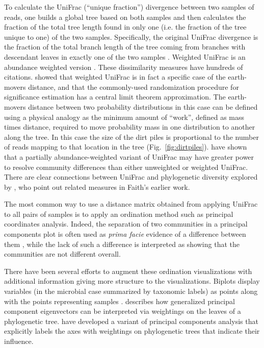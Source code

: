 \documentclass{amsart}
\begin{document}
To calculate the UniFrac (``unique fraction'') divergence between two samples of reads, one builds a global tree based on both samples and then calculates the fraction of the total tree length found in only one (i.e. the fraction of the tree unique to one) of the two samples.
Specifically, the original UniFrac divergence is the fraction of the total branch length of the tree coming from branches with descendant leaves in exactly one of the two samples \citep[Fig.~\ref{fig:unifrac};][]{LozuponeKnightUniFrac05}.
Weighted UniFrac is an abundance weighted version \citep{LozuponeEaWeightedUnifrac07}.
These dissimilarity measures have hundreds of citations.
\citet{evans2012phylogenetic} showed that weighted UniFrac is in fact a specific case of the earth-movers distance, and that the commonly-used randomization procedure for significance estimation has a central limit theorem approximation.
The earth-movers distance \citep{monge1781memoire,Villani2003-wv} between two probability distributions in this case can be defined using a physical analogy as the minimum amount of ``work'', defined as mass times distance, required to move probability mass in one distribution to another along the tree.
In this case the size of the dirt piles is proportional to the number of reads mapping to that location in the tree (Fig.~\ref{fig:dirtpiles}).
\citet{chen2012associating} have shown that a partially abundance-weighted variant of UniFrac may have greater power to resolve community differences than either unweighted or weighted UniFrac.
There are clear connections between UniFrac and phylogenetic diversity explored by \citet{faith2009cladistic}, who point out related measures in Faith's earlier work.

The most common way to use a distance matrix obtained from applying UniFrac to all pairs of samples is to apply an ordination method such as principal coordinates analysis.
Indeed, the separation of two communities in a principal components plot is often used as \emph{prima facie} evidence of a difference between them
\citep[e.g.][]{lozupone2007global,costello2009bacterial,yatsunenko2012human}, while the lack of such a difference is interpreted as showing that the communities are not different overall.

There have been several efforts to augment these ordination visualizations with additional information giving more structure to the visualizations.
Biplots display variables (in the microbial case summarized by taxonomic labels) as points along with the points representing samples \citep[e.g.][]{hewitt2013bacterial,lozupone2013meta}.
\citet{PurdomAnalyzingDataGraphs08} describes how generalized principal component eigenvectors can be interpreted via weightings on the leaves of a phylogenetic tree.
\citet{matsen2013edge} have developed a variant of principal components analysis that explicitly labels the axes with weightings on phylogenetic trees that indicate their influence.
\end{document}
